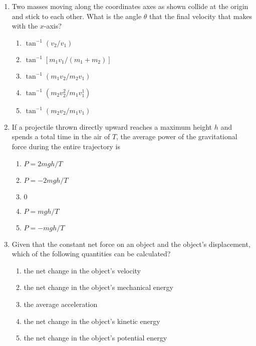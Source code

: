 \documentclass{../../oss-apphys}
\begin{document}
\begin{multicols}{2}
\begin{enumerate}[resume,leftmargin=18pt]
  \item Two masses moving along the coordinates axes as shown collide at the
    origin and stick to each other. What is the angle $\theta$ that the final
    velocity that makes with the $x$-axis?
    \begin{center}
    \end{center}

    \begin{enumerate}[noitemsep,topsep=0pt,leftmargin=18pt,label=(\Alph*)]
    \item $\tan^{-1}(v_2/v_1)$
    \item $\tan^{-1}[m_1v_1/(m_1+m_2)]$
    \item $\tan^{-1}(m_1v_2/m_2v_1)$
    \item $\tan^{-1}(m_2v_2^2/m_1v_1^1)$
    \item $\tan^{-1}(m_2v_2/m_1v_1)$
    \end{enumerate}
    \columnbreak
    
  \item If a projectile thrown directly upward reaches a maximum height $h$ and
    spends a total time in the air of $T$, the average power of the
    gravitational force during the entire trajectory is
    \begin{enumerate}[noitemsep,topsep=0pt,leftmargin=18pt,label=(\Alph*)]
    \item $P=2mgh/T$
    \item $P=-2mgh/T$
    \item $0$
    \item $P=mgh/T$
    \item $P=-mgh/T$
    \end{enumerate}

  \item Given that the constant net force on an object and the object's 
    displacement, which of the following quantities can be calculated?
    \begin{enumerate}[noitemsep,topsep=0pt,leftmargin=18pt,label=(\Alph*)]
    \item the net change in the object's velocity
    \item the net change in the object's mechanical energy
    \item the average acceleration
    \item the net change in the object's kinetic energy
    \item the net change in the object's potential energy
    \end{enumerate}


\end{enumerate}
\end{multicols}
\end{document}
